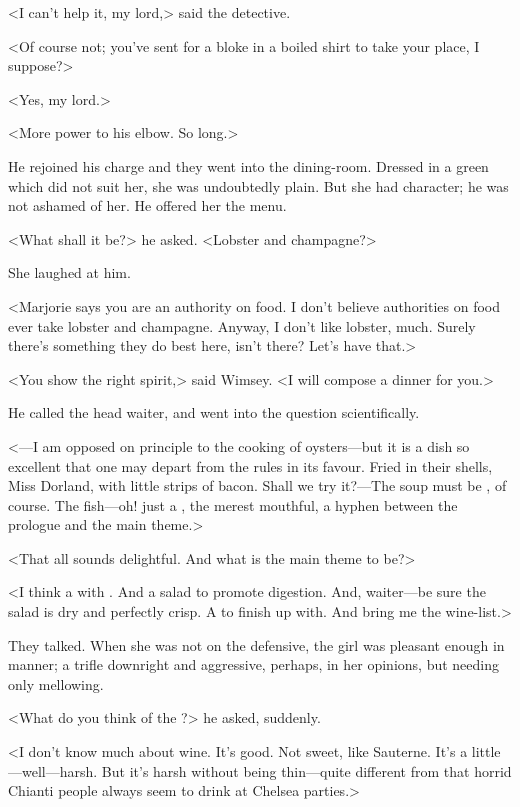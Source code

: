 <I can't help it, my lord,> said the detective.

<Of course not; you've sent for a bloke in a boiled shirt to take your place, I suppose?>

<Yes, my lord.>

<More power to his elbow. So long.>

He rejoined his charge and they went into the dining-room. Dressed in a green which did not suit her, she was undoubtedly plain. But she had character; he was not ashamed of her. He offered her the menu.

<What shall it be?> he asked. <Lobster and champagne?>

She laughed at him.

<Marjorie says you are an authority on food. I don't believe authorities on food ever take lobster and champagne. Anyway, I don't like lobster, much. Surely there's something they do best here, isn't there? Let's have that.>

<You show the right spirit,> said Wimsey. <I will compose a dinner for you.>

He called the head waiter, and went into the question scientifically.

<—I am opposed on principle to the cooking of oysters—but it is a dish so excellent that one may depart from the rules in its favour. Fried in their shells, Miss Dorland, with little strips of bacon. Shall we try it?—The soup must be , of course. The fish—oh! just a , the merest mouthful, a hyphen between the prologue and the main theme.>

<That all sounds delightful. And what is the main theme to be?>

<I think a  with . And a salad to promote digestion. And, waiter—be sure the salad is dry and perfectly crisp. A  to finish up with. And bring me the wine-list.>

They talked. When she was not on the defensive, the girl was pleasant enough in manner; a trifle downright and aggressive, perhaps, in her opinions, but needing only mellowing.

<What do you think of the ?> he asked, suddenly.

<I don't know much about wine. It's good. Not sweet, like Sauterne. It's a little—well—harsh. But it's harsh without being thin—quite different from that horrid Chianti people always seem to drink at Chelsea parties.>

